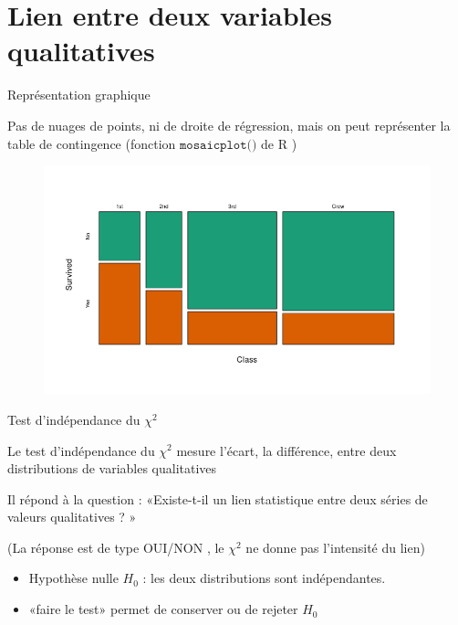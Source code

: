 \documentclass{beamer}
\begin{document}
\section{Lien entre deux variables qualitatives}
\begin{frame}{Représentation graphique}
  
  Pas de nuages de points, ni de droite de régression, mais on peut représenter la \alert{table de contingence} (fonction $\texttt{mosaicplot()}$
 de R ) 
 
  
\begin{figure}
  \centering
     \includegraphics[width=.9\linewidth]{img/mosaic.png}
\end{figure}
  
   
\end{frame}


\begin{frame}{Test d'indépendance du $\chi ^2$}



Le test d'indépendance du $\chi ^2$  mesure l'\alert{écart}, la différence,  entre deux distributions de variables \alert{qualitatives}  

Il répond à la question : «Existe-t-il un lien statistique entre deux séries de valeurs qualitatives ? »  

(La réponse est de type  OUI/NON , le $\chi^2$ ne donne pas l'\alert{intensité} du lien)

\begin{itemize}
\item Hypothèse nulle $H_0$ : les deux distributions sont indépendantes.
\item «faire le test» permet de conserver ou de rejeter $H_0$
\end{itemize}

\end{frame}
\end{document}
